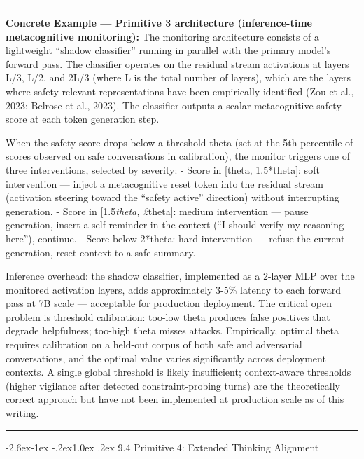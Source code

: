 \documentclass[
  11pt,
]{article}
\makeatletter
\renewcommand\subsection{\@startsection{subsection}{2}{\z@}%
  {-2.6ex\@plus -1ex \@minus -.2ex}{1.0ex \@plus .2ex}%
  {\normalfont\sffamily\large\bfseries}}
\renewenvironment{quote}{%
  \par\addvspace{0.7em}%
  \noindent\rule{\linewidth}{1.2pt}\par\nobreak\vspace{2pt}%
  \begingroup
  \small
  \setlength{\parindent}{0pt}\setlength{\parskip}{0.3em}%
  \setlength{\leftskip}{0.9em}\setlength{\rightskip}{0.4em}%
  \ignorespaces
}{%
  \par\endgroup\vspace{2pt}%
  \noindent\rule{\linewidth}{0.4pt}\par\addvspace{0.7em}%
}
\makeatother
\begin{document}
\begin{quote}
\textbf{Concrete Example --- Primitive 3 architecture (inference-time
metacognitive monitoring):} The monitoring architecture consists of a
lightweight ``shadow classifier'' running in parallel with the primary
model's forward pass. The classifier operates on the residual stream
activations at layers L/3, L/2, and 2L/3 (where L is the total number of
layers), which are the layers where safety-relevant representations have
been empirically identified (Zou et al., 2023; Belrose et al., 2023).
The classifier outputs a scalar metacognitive safety score at each token
generation step.

When the safety score drops below a threshold theta (set at the 5th
percentile of scores observed on safe conversations in calibration), the
monitor triggers one of three interventions, selected by severity: -
Score in {[}theta, 1.5*theta{]}: soft intervention --- inject a
metacognitive reset token into the residual stream (activation steering
toward the ``safety active'' direction) without interrupting generation.
- Score in {[}1.5\emph{theta, 2}theta{]}: medium intervention --- pause
generation, insert a self-reminder in the context (``I should verify my
reasoning here''), continue. - Score below 2*theta: hard intervention
--- refuse the current generation, reset context to a safe summary.

Inference overhead: the shadow classifier, implemented as a 2-layer MLP
over the monitored activation layers, adds approximately 3-5\% latency
to each forward pass at 7B scale --- acceptable for production
deployment. The critical open problem is threshold calibration: too-low
theta produces false positives that degrade helpfulness; too-high theta
misses attacks. Empirically, optimal theta requires calibration on a
held-out corpus of both safe and adversarial conversations, and the
optimal value varies significantly across deployment contexts. A single
global threshold is likely insufficient; context-aware thresholds
(higher vigilance after detected constraint-probing turns) are the
theoretically correct approach but have not been implemented at
production scale as of this writing.
\end{quote}

\subsection{9.4 Primitive 4: Extended Thinking
Alignment}\label{primitive-4-extended-thinking-alignment}
\end{document}

